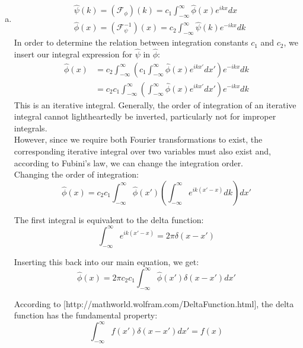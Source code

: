 \documentclass[a4paper,german,12pt,smallheadings]{scrartcl}
\begin{document}
\begin{enumerate}[a)]
\item \begin{align*}
&\hat{\psi}(k)=(\mathcal{F_\phi})(k)=c_1\int_{-\infty}^{\infty}\hat{\phi}(x)e^{ikx}dx\\
&\hat{\phi}(x)=(\mathcal{F^{-1}_\psi})(x)=c_2\int_{-\infty}^{\infty}\hat{\psi}(k)e^{-ikx}dk
\end{align*}
In order to determine the relation between integration constants $c_1$ and $c_2$, we insert our integral expression for $\hat{\psi}$ in $\hat{\phi}$:
\begin{align*}
\hat{\phi}(x)&=c_2\int_{-\infty}^{\infty}\left(c_1\int_{-\infty}^{\infty}\hat{\phi}(x)e^{ikx'}dx'\right)e^{-ikx}dk\\
&=c_2c_1\int_{-\infty}^{\infty}\left(\int_{-\infty}^{\infty}\hat{\phi}(x)e^{ikx'}dx'\right)e^{-ikx}dk
\end{align*}
This is an iterative integral. Generally, the order of integration of an iterative integral cannot lightheartedly be inverted, particularly not for improper integrals.\\

However, since we require both Fourier transformations to exist, the corresponding iterative integral over two variables must also exist and, according to Fubini's law, we can change the integration order. \\


Changing the order of integration:
\begin{equation*}
\hat{\phi}(x)=c_2c_1\int_{-\infty}^{\infty}\hat{\phi}(x')\left(\int_{-\infty}^{\infty}e^{ik(x'-x)}dk\right)dx'
\end{equation*}

The first integral is equivalent to the delta function:
\begin{equation*}
\int_{-\infty}^{\infty}e^{ik(x'-x)}=2\pi\delta(x-x')
\end{equation*}

Inserting this back into our main equation, we get:
\begin{equation*}
\hat{\phi}(x)=2\pi c_2c_1\int_{-\infty}^{\infty}\hat{\phi}(x')\delta(x-x')dx'
\end{equation*}

According to [http://mathworld.wolfram.com/DeltaFunction.html], the delta function has the fundamental property:
\begin{equation*}
\int_{- \infty}^{\infty}f(x')\delta(x-x')dx'=f(x)
\end{equation*}


\end{enumerate}
\end{document}

